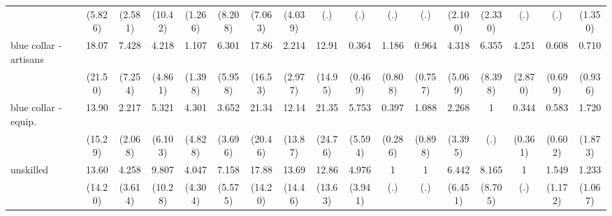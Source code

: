 {\begin{tabular}{l*{16}{c}}
                    &     (5.826)         &     (2.581)         &     (10.42)         &     (1.266)         &     (8.208)         &     (7.063)         &     (4.039)         &         (.)         &         (.)         &         (.)         &         (.)         &     (2.100)         &     (2.330)         &         (.)         &         (.)         &     (1.350)         \\
[1em]
blue collar - artisans&       18.07\sym{*}  &       7.428\sym{*}  &       4.218         &       1.107         &       6.301         &       17.86\sym{**} &       2.214         &       12.91\sym{*}  &       0.364         &       1.186         &       0.964         &       4.318         &       6.355         &       4.251\sym{*}  &       0.608         &       0.710         \\
                    &     (21.50)         &     (7.254)         &     (4.861)         &     (1.398)         &     (5.958)         &     (16.53)         &     (2.977)         &     (14.95)         &     (0.469)         &     (0.808)         &     (0.757)         &     (5.069)         &     (8.398)         &     (2.870)         &     (0.699)         &     (0.936)         \\
[1em]
blue collar - equip.&       13.90\sym{*}  &       2.217         &       5.321         &       4.301         &       3.652         &       21.34\sym{**} &       12.14\sym{*}  &       21.35\sym{**} &       5.753         &       0.397         &       1.088         &       2.268         &           1         &       0.344         &       0.583         &       1.720         \\
                    &     (15.29)         &     (2.068)         &     (6.103)         &     (4.828)         &     (3.696)         &     (20.46)         &     (13.87)         &     (24.76)         &     (5.594)         &     (0.286)         &     (0.898)         &     (3.395)         &         (.)         &     (0.361)         &     (0.602)         &     (1.873)         \\
[1em]
unskilled           &       13.60\sym{*}  &       4.258         &       9.807\sym{*}  &       4.047         &       7.158\sym{*}  &       17.88\sym{***}&       13.69\sym{*}  &       12.86\sym{*}  &       4.976\sym{*}  &           1         &           1         &       6.442         &       8.165\sym{*}  &           1         &       1.549         &       1.233         \\
                    &     (14.20)         &     (3.614)         &     (10.28)         &     (4.304)         &     (5.575)         &     (14.20)         &     (14.46)         &     (13.63)         &     (3.941)         &         (.)         &         (.)         &     (6.451)         &     (8.705)         &         (.)         &     (1.172)         &     (1.067)         \\

\end{tabular}}
